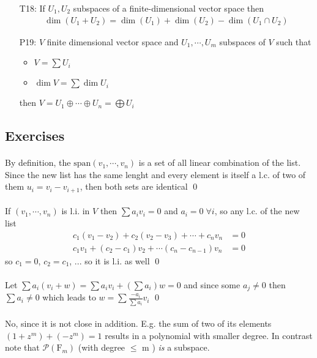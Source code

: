 \documentclass[11pt,notitlepage,oneside]{article}
\DeclareMathOperator{\dimension}{dim}
\newcommand{\exo}[1]{%
\addtocontents{toc}{\protect\setcounter{tocdepth}{2}}%
\paragraph{#1}}
\begin{document}
\begin{itemize}
%
\item[T18:\label{it:T2_18}] If $U_1,U_2$ subspaces of a finite-dimensional vector space then 
\begin{align*}
\dimension(U_1+U_2)=\dimension(U_1)+\dimension(U_2) - \dimension(U_1\cap U_2)
\end{align*}
\item[P19:\label{it:T2_19}] $V$ finite dimensional vector space and $U_1,\cdots,U_m$ subspaces of $V$ such that 
\begin{itemize}
  \item $V=\sum U_i$
  \item $\dimension{V}=\sum\dimension{U_i}$
\end{itemize}
 then $V=U_1 \oplus \cdots \oplus U_n = \bigoplus U_i$
\end{itemize}



\subsection*{Exercises}
\exo{}
By definition, the $\mathrm{span}(v_1,\cdots,v_n)$ is a set of all linear combination of the list. Since 
the new list has the same lenght and every element is itself a l.c. of two of them $u_i = v_i-v_{i+1}$, 
then both sets are identical \qed

\exo{} If $(v_1,\cdots,v_n)$ is l.i. in $V$ then $\sum a_i v_i = 0$ and $a_i = 0\; \forall i$, so any l.c. of the new list 
\begin{align*}
  c_1 (v_1 - v_2) + c_2 (v_2 - v_3) + \cdots + c_n v_n &= 0\\
  c_1 v_1 + (c_2 - c_1) v_2 + \cdots (c_n - c_{n-1})v_n &= 0
\end{align*}
so $c_1=0$, $c_2 = c_1$, ...  so it is l.i. as well \qed
\exo{} Let $\sum a_i (v_i + w) = \sum a_i v_i + (\sum a_i) w = 0$ and since some $a_j\neq 0$ then $\sum a_i\neq 0$ 
which leads to $w = \sum \frac{-a_i}{\sum a_i} v_i$ \qed 

\exo{} No, since it is not close in addition. E.g. the sum of two of its elements $ (1 + z^m) + (- z^m) = 1  $ 
results in a polynomial with smaller degree. In contrast note that $\mathcal{P}(\mathrm{F}_m)$ (with degree $\leq$ m ) 
\emph{is} a subspace. 
\end{document}
